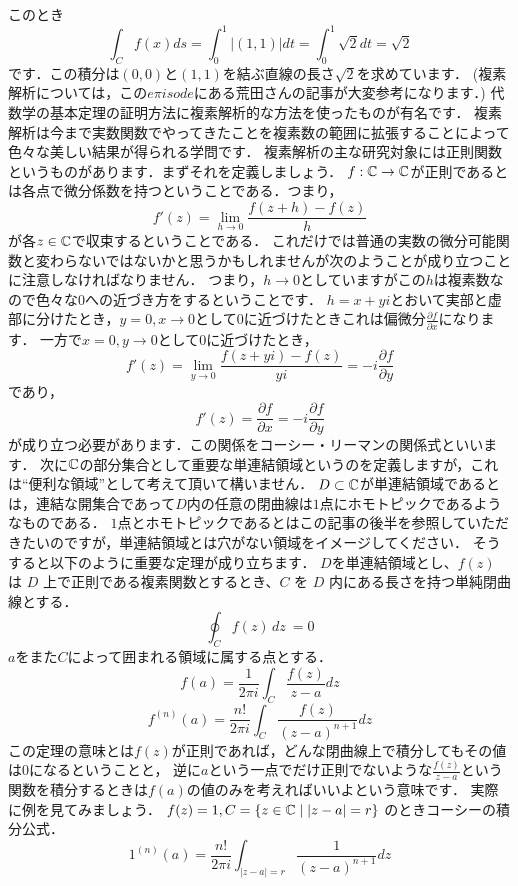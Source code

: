 このとき
\[
\int_C f(x) ds = \int_0^1 |(1,1)| dt = \int_0^1 \sqrt{2}  dt  = \sqrt{2}
\]
です．この積分は$(0,0)$と$(1,1)$を結ぶ直線の長さ$\sqrt{2}$を求めています．
\exx
{}
(複素解析については，この$e\pi isode$にある荒田さんの記事が大変参考になります．)
代数学の基本定理の証明方法に複素解析的な方法を使ったものが有名です．
複素解析は今まで実数関数でやってきたことを複素数の範囲に拡張することによって色々な美しい結果が得られる学問です．
複素解析の主な研究対象には正則関数というものがあります．まずそれを定義しましょう．
$f:\mathbb C \to \mathbb C$が正則であるとは各点で微分係数を持つということである．つまり，
\[
f'(z) = \lim_{h\to 0} \frac{f(z+h) - f(z)}{h}
\]
が各$z\in\mathbb C$で収束するということである．
\rem
これだけでは普通の実数の微分可能関数と変わらないではないかと思うかもしれませんが次のようことが成り立つことに注意しなければなりません．
つまり，$h\to 0$としていますがこの$h$は複素数なので色々な$0$への近づき方をするということです．
$h=x+yi$とおいて実部と虚部に分けたとき，$y=0,x\to 0$として$0$に近づけたときこれは偏微分$\frac{\partial f}{\partial x}$になります．
一方で$x=0,y\to 0$として$0$に近づけたとき，
\[
f'(z) = \lim_{y\to 0} \frac{f(z+yi)-f(z)}{yi} = -i\frac{\partial f}{\partial y}
\]
であり，
\[
f'(z) = \frac{\partial f}{\partial x} = -i\frac{\partial f}{\partial y}
\]
が成り立つ必要があります．この関係をコーシー・リーマンの関係式といいます．
\remx
次に$\mathbb C$の部分集合として重要な単連結領域というのを定義しますが，これは``便利な領域''として考えて頂いて構いません．
$D \subset \mathbb C$が単連結領域であるとは，連結な開集合であって$D$内の任意の閉曲線は$1$点にホモトピックであるようなものである．
$1$点とホモトピックであるとはこの記事の後半を参照していただきたいのですが，単連結領域とは穴がない領域をイメージしてください．
そうすると以下のように重要な定理が成り立ちます．
\thm[コーシーの積分定理と積分公式]
$D$を単連結領域とし、$f(z)$ は $D$ 上で正則である複素関数とするとき、$C$ を $D$ 内にある長さを持つ単純閉曲線とする．
\[
 \oint_C f(z) \, dz\ = 0
\]
$a$をまた$C$によって囲まれる領域に属する点とする．
\[
 f(a) = \frac{1}{2 \pi i}\int_C \frac{f(z)}{z-a}dz
\]
\[
 f^{(n)}(a) = \frac{n!}{2 \pi i}\int_C \frac{f(z)}{(z-a)^{n+1}}dz
\]
\thmx
この定理の意味とは$f(z)$が正則であれば，どんな閉曲線上で積分してもその値は$0$になるということと，
逆に$a$という一点でだけ正則でないような$\frac{f(z)}{z-a}$という関数を積分するときは$f(a)$の値のみを考えればいいよという意味です．
実際に例を見てみましょう．
\ex[コーシーの積分公式の例]
$f(z) = 1 , C = \{z\in\mathbb C \mid |z-a|=r\} $ のときコーシーの積分公式．\\
\[
1^{(n)}(a) = \frac{n!}{2 \pi i}\int_{|z-a|=r} \frac{1}{(z-a)^{n+1}} dz 
\]
